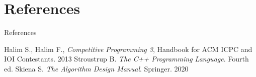 \documentclass{beamer}
\begin{document}
\section*{References}
\begin{frame}{References}
    \begin{thebibliography}{}
         Halim S., Halim F., \textit{Competitive Programming 3}, Handbook for ACM ICPC and IOI Contestants. 2013
         Stroustrup B. \textit{The C++ Programming Language}. Fourth ed. 
         Skiena S. \textit{The Algorithm Design Manual}. Springer. 2020
    \end{thebibliography}
\end{frame}
\end{document}
